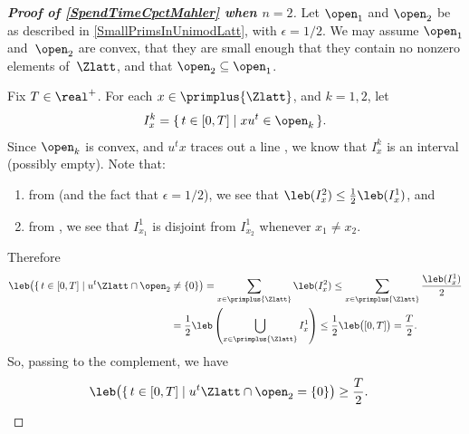 \begin{proof}[\bf Proof of \cref{SpendTimeCpctMahler} when $n = 2$]
Let $\open_1$ and $\open_2$ be as described in \cref{SmallPrimsInUnimodLatt}, with $\epsilon = 1/2$.
We may assume $\open_1$ and~$\open_2$ are convex, that they are small enough that they contain no nonzero elements of~$\Zlatt$, and that $\open_2 \subseteq \open_1$.

Fix $T \in \real^+$. For each $x \in \primplus{\Zlatt}$, and $k = 1,2$, let 
	$$ I^k_x = \{\, t \in [0,T] \mid x u^t  \in \open_k \,\} .$$
Since $\open_k$ is convex, and $u^t x$ traces out a line , we know that $I^k_x$ is an interval (possibly empty). Note that:
	\begin{enumerate}
	\item  from  (and the fact that $\epsilon = 1/2$), we see that 
	$ \leb( I^2_x ) \le \frac{1}{2} \leb( I^1_x )  $,
	and
	\item  from  , we see that $I^1_{x_1}$ is disjoint from $I^1_{x_2}$ whenever $x_1 \neq x_2$.
	\end{enumerate}
Therefore
	\begin{align*}
	 \leb \bigl( \{\, t \in [0,T] \mid u^t \Zlatt  \cap \open_2 & \neq \{0\} \bigr) 
	= \sum_{x \in \primplus{\Zlatt}} \leb( I^2_x ) 
	\le \sum_{x \in \primplus{\Zlatt}} \frac{\leb( I^1_x )}{2}
	\\&= \frac{1}{2} \leb \left(  \bigcup_{x \in \primplus{\Zlatt}} I^1_x  \right)
	\le \frac{1}{2} \leb \bigl(  [0,T] \bigr)
	=  \frac{T}{2} 
	. \end{align*}
So, passing to the complement, we have
	\begin{align*}
	\leb \bigl( \{\, t \in [0,T] \mid u^t \Zlatt \cap \open_2 = \{0\} \bigr) 
	\ge \frac{T}{2} 
	. & \qedhere \end{align*}
\end{proof}

